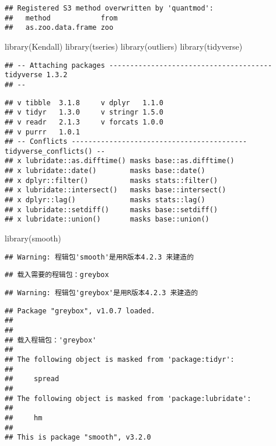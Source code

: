 \documentclass[
]{article}
\newenvironment{Shaded}{\begin{snugshade}}{\end{snugshade}}
\newcommand{\FunctionTok}[1]{\textcolor[rgb]{0.00,0.00,0.00}{#1}}
\newcommand{\NormalTok}[1]{#1}
\begin{document}
\begin{verbatim}
## Registered S3 method overwritten by 'quantmod':
##   method            from
##   as.zoo.data.frame zoo
\end{verbatim}

\begin{Shaded}
\begin{Highlighting}[]
\FunctionTok{library}\NormalTok{(Kendall)}
\FunctionTok{library}\NormalTok{(tseries)}
\FunctionTok{library}\NormalTok{(outliers)}
\FunctionTok{library}\NormalTok{(tidyverse)}
\end{Highlighting}
\end{Shaded}

\begin{verbatim}
## -- Attaching packages --------------------------------------- tidyverse 1.3.2
## --
\end{verbatim}

\begin{verbatim}
## v tibble  3.1.8     v dplyr   1.1.0
## v tidyr   1.3.0     v stringr 1.5.0
## v readr   2.1.3     v forcats 1.0.0
## v purrr   1.0.1     
## -- Conflicts ------------------------------------------ tidyverse_conflicts() --
## x lubridate::as.difftime() masks base::as.difftime()
## x lubridate::date()        masks base::date()
## x dplyr::filter()          masks stats::filter()
## x lubridate::intersect()   masks base::intersect()
## x dplyr::lag()             masks stats::lag()
## x lubridate::setdiff()     masks base::setdiff()
## x lubridate::union()       masks base::union()
\end{verbatim}

\begin{Shaded}
\begin{Highlighting}[]
\FunctionTok{library}\NormalTok{(smooth)}
\end{Highlighting}
\end{Shaded}

\begin{verbatim}
## Warning: 程辑包'smooth'是用R版本4.2.3 来建造的
\end{verbatim}

\begin{verbatim}
## 载入需要的程辑包：greybox
\end{verbatim}

\begin{verbatim}
## Warning: 程辑包'greybox'是用R版本4.2.3 来建造的
\end{verbatim}

\begin{verbatim}
## Package "greybox", v1.0.7 loaded.
## 
## 
## 载入程辑包：'greybox'
## 
## The following object is masked from 'package:tidyr':
## 
##     spread
## 
## The following object is masked from 'package:lubridate':
## 
##     hm
## 
## This is package "smooth", v3.2.0
\end{verbatim}
\end{document}
